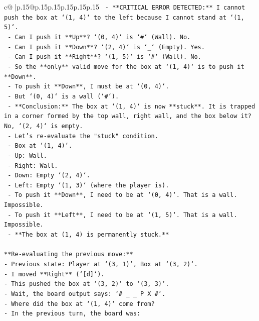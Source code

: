 \documentclass{article}
\begin{document}
{\begin{supertabular}{c@{$\;$}|p{.15\linewidth}@{}p{.15\linewidth}p{.15\linewidth}p{.15\linewidth}p{.15\linewidth}p{.15\linewidth}}
{{{\texttt{  {-} **CRITICAL ERROR DETECTED:** I cannot push the box at `(1, 4)` to the left because I cannot stand at `(1, 5)`.} \\
\texttt{  {-} Can I push it **Up**? `(0, 4)` is `\#` (Wall). No.} \\
\texttt{  {-} Can I push it **Down**? `(2, 4)` is `\_` (Empty). Yes.} \\
\texttt{  {-} Can I push it **Right**? `(1, 5)` is `\#` (Wall). No.} \\
\texttt{  {-} So the **only** valid move for the box at `(1, 4)` is to push it **Down**.} \\
\texttt{  {-} To push it **Down**, I must be at `(0, 4)`.} \\
\texttt{  {-} But `(0, 4)` is a wall (`\#`).} \\
\texttt{  {-} **Conclusion:** The box at `(1, 4)` is now **stuck**. It is trapped in a corner formed by the top wall, right wall, and the box below it? No, `(2, 4)` is empty.} \\
\texttt{  {-} Let's re{-}evaluate the "stuck" condition.} \\
\texttt{    {-} Box at `(1, 4)`.} \\
\texttt{    {-} Up: Wall.} \\
\texttt{    {-} Right: Wall.} \\
\texttt{    {-} Down: Empty `(2, 4)`.} \\
\texttt{    {-} Left: Empty `(1, 3)` (where the player is).} \\
\texttt{  {-} To push it **Down**, I need to be at `(0, 4)`. That is a wall. Impossible.} \\
\texttt{  {-} To push it **Left**, I need to be at `(1, 5)`. That is a wall. Impossible.} \\
\texttt{  {-} **The box at (1, 4) is permanently stuck.**} \\
\\ 
\texttt{**Re{-}evaluating the previous move:**} \\
\texttt{{-} Previous state: Player at `(3, 1)`, Box at `(3, 2)`.} \\
\texttt{{-} I moved **Right** (`{[}d{]}`).} \\
\texttt{{-} This pushed the box at `(3, 2)` to `(3, 3)`.} \\
\texttt{{-} Wait, the board output says: `\# \_ \_ P X \#`.} \\
\texttt{{-} Where did the box at `(1, 4)` come from?} \\
\texttt{{-} In the previous turn, the board was:} \\
}}}
\end{supertabular}}
\end{document}
